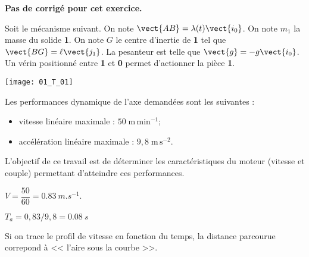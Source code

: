 \normaltrue
\correctionfalse


\setcounter{numques}{0}
\ifcorrection
\else
\textbf{Pas de corrigé pour cet exercice.}
\fi

\ifprof
\else
Soit le mécanisme suivant. On note $\vect{AB}=\lambda(t)\vect{i_0}$. On note $m_1$ la masse du solide \textbf{1}.
On note $G$ le centre d'inertie de \textbf{1} tel que $\vect{BG}=\ell \vect{j_1}$. La pesanteur est telle que $\vect{g}=-g\vect{i_0}$. Un vérin positionné entre \textbf{1} et \textbf{0} permet d'actionner la pièce \textbf{1}. 
\begin{center}
\texttt{[image: 01\_T\_01]}
\end{center}



Les performances dynamique de l'axe demandées sont les suivantes : 
\begin{itemize}
\item vitesse linéaire maximale : $50 \; \text{m}\,\text{min}^{-1}$;
\item accélération linéaire maximale : $9,8 \; \text{m}\, \text{s}^{-2}$.
\end{itemize}

\begin{obj}
L'objectif de ce travail est de déterminer les caractéristiques du moteur (vitesse et couple) permettant d'atteindre ces performances.
\end{obj}
\fi

\ifprof
$V = \dfrac{50}{60} = \SI{0,83}{m.s^{-1}}$.
\else
\fi

\ifprof
$T_a =0,83/9,8 = \SI{0,08}{s}$


\else
\fi

\ifprof
Si on trace le profil de vitesse en fonction du temps, la distance parcourue correpond à << l'aire sous la courbe >>. 

